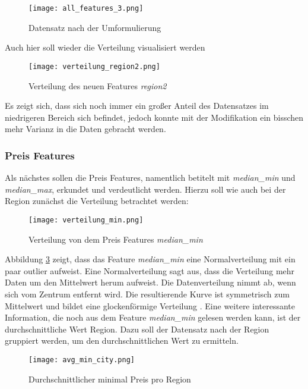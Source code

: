 \begin{figure}[h]
    \centering
    \texttt{[image: all\_features\_3.png]}
    \caption[Datensatz nach der Umformulierung]{Datensatz nach der Umformulierung}
    \label{img:all_features_3}
\end{figure}

Auch hier soll wieder die Verteilung visualisiert werden

\begin{figure}[h]
    \centering
    \texttt{[image: verteilung\_region2.png]}
    \caption[Verteilung des neuen Features \emph{region2}]{Verteilung des neuen Features \emph{region2}}
    \label{img:verteilung_region_2}
\end{figure}

Es zeigt sich, dass sich noch immer ein großer Anteil des Datensatzes im niedrigeren Bereich sich befindet, jedoch konnte mit der Modifikation ein bisschen mehr Varianz in die Daten gebracht werden.

\subsubsection{Preis Features}
Als nächstes sollen die Preis Features, namentlich betitelt mit \emph{median\_min} und \emph{median\_max}, erkundet und verdeutlicht werden. Hierzu soll wie auch bei der Region zunächst die Verteilung betrachtet werden:
\newpage
\begin{figure}[h]
    \centering
    \texttt{[image: verteilung\_min.png]}
    \caption[Verteilung von dem Preis Features \emph{median\_min}]{Verteilung von dem Preis Features \emph{median\_min}}
    \label{img:verteilung_min}
\end{figure}

Abbildung \ref{img:verteilung_min} zeigt, dass das Feature \emph{median\_min} eine Normalverteilung mit ein paar outlier aufweist. Eine Normalverteilung  sagt aus, dass die Verteilung mehr Daten um den Mittelwert herum aufweist. Die Datenverteilung nimmt ab, wenn sich vom Zentrum entfernt wird. Die resultierende Kurve ist symmetrisch zum Mittelwert und bildet eine glockenförmige Verteilung \cite{Shrishty.05.08.2021}.
\newline
\newline
Eine weitere interessante Information, die noch aus dem Feature \emph{median\_min} gelesen werden kann, ist der durchschnittliche Wert Region. Dazu soll der Datensatz nach der Region gruppiert werden, um den durchschnittlichen Wert zu ermitteln.
\newpage
\begin{figure}[h]
    \centering
    \texttt{[image: avg\_min\_city.png]}
    \caption[Durchschnittlicher minimal Preis pro Region]{Durchschnittlicher minimal Preis pro Region}
    \label{img:avg_min_city}
\end{figure}

